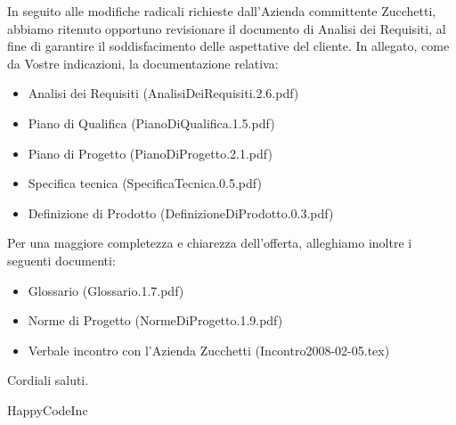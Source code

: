 \documentclass[11pt,titlepage,a4paper]{report}
\begin{document}
In seguito alle modifiche radicali richieste dall'Azienda committente Zucchetti, abbiamo ritenuto opportuno revisionare il documento di Analisi dei Requisiti, al fine di garantire il soddisfacimento delle aspettative del cliente. \newline
In allegato, come da Vostre indicazioni, la documentazione relativa:
\begin{itemize}
\item{}Analisi dei Requisiti (AnalisiDeiRequisiti.2.6.pdf)
\item{}Piano di Qualifica (PianoDiQualifica.1.5.pdf)
\item{}Piano di Progetto (PianoDiProgetto.2.1.pdf)
\item{}Specifica tecnica (SpecificaTecnica.0.5.pdf) 
\item{}Definizione di Prodotto (DefinizioneDiProdotto.0.3.pdf)
\end{itemize}
Per una maggiore completezza e chiarezza dell'offerta, alleghiamo inoltre i seguenti documenti:
\begin{itemize}
\item{}Glossario (Glossario.1.7.pdf)
\item{}Norme di Progetto (NormeDiProgetto.1.9.pdf)
\item{}Verbale incontro con l'Azienda Zucchetti (Incontro2008-02-05.tex)
\end{itemize}
Cordiali saluti.
\begin{flushright}
HappyCodeInc
\end{flushright}
\newpage
\end{document}
